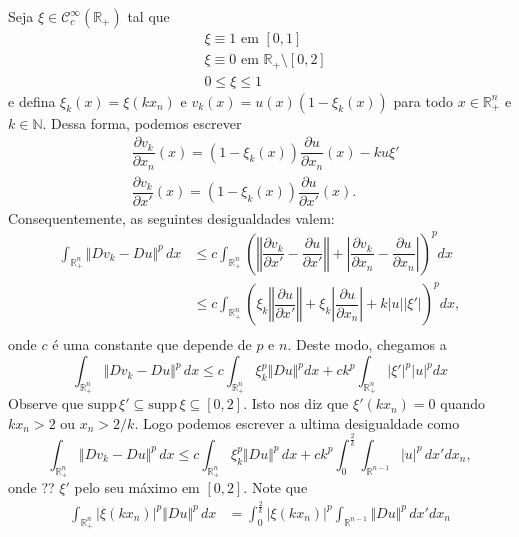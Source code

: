 \documentclass[a4paper, 11pt]{book}
\theoremstyle{definition}
\newcommand{\bN}{\mathbb{N}}
\newcommand{\bR}{\mathbb{R}}
\newcommand{\cC}{\mathcal{C}}
\newcommand{\supp}{\mathrm{supp}\,}
\begin{document}
\begin{prf}
    Seja $\xi \in \cC^{\infty}_c(\bR_+)$ tal que
    \[
        \begin{aligned}
            &\xi \equiv 1 \text{ em } [0,1]\\
            &\xi \equiv 0 \text{ em } \bR_+ \setminus [0,2]\\
            &0 \leqslant \xi \leqslant 1
        \end{aligned}
    \]
    e defina $\xi_k(x) = \xi(kx_n)$ e $v_k(x) = u(x) (1 - \xi_k(x))$ para todo $x \in \bR^n_+$ e $k \in \bN$. Dessa forma, podemos escrever
    \[
        \begin{aligned}
            &\dfrac{\partial v_k}{\partial x_n}(x) = (1 - \xi_k(x))\dfrac{\partial u}{\partial x_n}(x) - ku\xi'\\
            &\dfrac{\partial v_k}{\partial x'}(x) = (1-\xi_k(x))\dfrac{\partial u}{\partial x'}(x).
        \end{aligned}
    \]
    Consequentemente, as seguintes desigualdades valem:
    \[
        \begin{aligned}
            \int_{\bR^n_+} \Vert Dv_k - Du \Vert^p \,dx &\leqslant c \int_{\bR^n_+} \left( \left\Vert \dfrac{\partial v_k}{\partial x'} - \dfrac{\partial u}{\partial x'} \right\Vert + \left| \dfrac{\partial v_k}{\partial x_n} - \dfrac{\partial u}{\partial x_n} \right| \right)^p dx\\
            &\leqslant c  \int_{\bR^n_+} \left( \xi_k\left\Vert \dfrac{\partial u}{\partial x'} \right\Vert + \xi_k \left| \dfrac{\partial u}{\partial x_n}\right| + k |u| |\xi'|  \right)^p dx,\\ 
        \end{aligned}
    \]
    onde $c$ é uma constante que depende de $p$ e $n$. Deste modo, chegamos a
    \begin{equation} \label{eq:asxa}
        \int_{\bR^n_+} \Vert Dv_k - Du \Vert^p \,dx \leqslant c \int_{\bR^n_+} \xi_k^p \Vert Du \Vert^p dx + ck^p \int_{\bR^n_+} |\xi'|^p |u|^p dx
    \end{equation}
    Observe que $\supp \xi' \subseteq \supp \xi \subseteq [0,2]$. Isto nos diz que $\xi'(kx_n) = 0$ quando $kx_n > 2$ ou $x_n > 2/k$.
    Logo podemos escrever a ultima desigualdade como
    \[
        \int_{\bR^n_+} \Vert Dv_k - Du \Vert^p \,dx \leqslant c \int_{\bR^{n}_+} \xi_k^p \Vert Du \Vert^p \,dx + ck^p \int_{0}^{\frac{2}{k}} \int_{\bR^{n-1}} |u|^p \,dx'dx_n,
    \]
    onde ?? $\xi'$ pelo seu máximo em $[0,2]$.
    Note que
    \[
        \begin{aligned}
            \int_{\bR^{n}_+} |\xi(kx_n)|^p \Vert Du \Vert^p \,dx &= \int_{0}^{\frac{2}{k}} |\xi(kx_n)|^p \int_{\bR^{n-1}} \Vert Du \Vert^p \,dx' dx_n\\

\end{aligned}\]
\end{prf}
\end{document}

